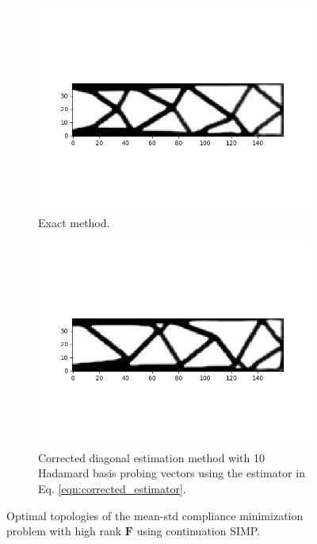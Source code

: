    \begin{figure}
      \begin{subfigure}[t]{0.8\textwidth}
        \centering
        \includegraphics[width=1\textwidth]{./images/robust_approx/results_2d_high_rank_figures/exact_svd_mean_std_csimp.png}
        \caption{Exact method.}
      \end{subfigure} \hfill
      \begin{subfigure}[t]{0.8\textwidth}
        \centering
        \includegraphics[width=1\textwidth]{./images/robust_approx/results_2d_high_rank_figures/diagonal_mean_std_csimp.png}
        \caption{Corrected diagonal estimation method with 10 Hadamard basis probing vectors using the estimator in Eq. \ref{eqn:corrected_estimator}.}
      \end{subfigure}
      \caption{Optimal topologies of the mean-std compliance minimization problem with high rank $\bm{F}$ using continuation SIMP.}
      \label{fig:mean_std_high_rank}
    \end{figure}

